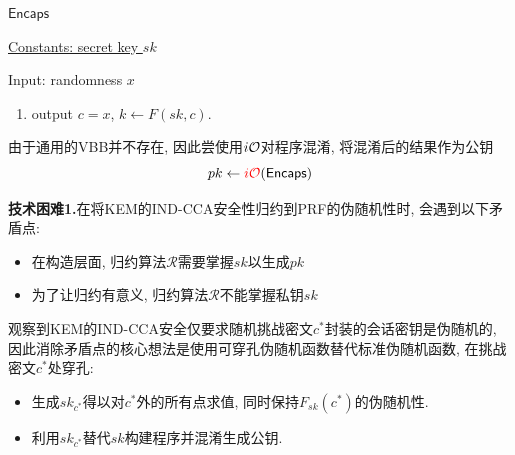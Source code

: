 \begin{framed}
\vspace{-1em}
\begin{center}$\mathsf{Encaps}$\end{center}
\begin{trivlist}
    \item \underline{Constants: secret key {$sk$}} 
    \item Input: randomness $x$ 
        \begin{enumerate}\itemsep 1pt \parskip 0pt \parsep 0pt
            \item output $c = x$, $k \leftarrow F(sk, c)$.
        \end{enumerate}
\end{trivlist}
\vspace{-1em}
\end{framed}

由于通用的VBB并不存在, 因此尝使用$i\mathcal{O}$对程序混淆, 将混淆后的结果作为公钥
\begin{equation*}
    pk \leftarrow {\color{red} i\mathcal{O}}(\mathsf{Encaps})
\end{equation*}

\begin{trivlist}
\item \textbf{技术困难1.}在将KEM的IND-CCA安全性归约到PRF的伪随机性时, 会遇到以下矛盾点: 
\begin{itemize}
    \item 在构造层面, 归约算法$\mathcal{R}$需要掌握$sk$以生成$pk$  
    \item 为了让归约有意义, 归约算法$\mathcal{R}$不能掌握私钥$sk$ 
\end{itemize}  
\end{trivlist} 

观察到KEM的IND-CCA安全仅要求随机挑战密文$c^*$封装的会话密钥是伪随机的, 
因此消除矛盾点的核心想法是使用可穿孔伪随机函数替代标准伪随机函数, 在挑战密文$c^*$处穿孔:
\begin{itemize}
    \item 生成$sk_{c^*}$得以对$c^*$外的所有点求值, 同时保持$F_{sk}(c^*)$的伪随机性. 
    \item 利用$sk_{c^*}$替代$sk$构建程序并混淆生成公钥. 
\end{itemize}


